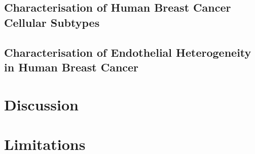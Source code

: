 \subsection{Characterisation of Human Breast Cancer Cellular Subtypes}







\subsection{Characterisation of Endothelial Heterogeneity in Human Breast Cancer}



\section{Discussion}

\section{Limitations}
